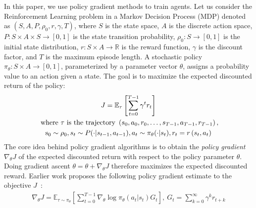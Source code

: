 \documentclass[letterpaper]{article}
\begin{document}
In this paper, we use  policy gradient methods to train agents.
Let us consider the Reinforcement Learning problem in a Markov Decision Process (MDP) denoted as $(S,A,P, \rho_0, r,\gamma, T)$, where $S$ is the state space, $A$ is the discrete action space, $P: S \times A \times S \rightarrow [0, 1]$ is the state transition probability, $\rho_0: S\rightarrow [0,1]$ is the initial state distribution, $r: S \times A \rightarrow \mathbb{R}$ is the reward function, $\gamma$ is the discount factor, and $T$ is the maximum episode length. A stochastic policy $\pi_{\theta}: S \times A \rightarrow [0,1]$, parameterized by a parameter vector $\theta$, assigns a probability value to an action given a state. The goal is to maximize the expected discounted return of the policy:
\begin{gather*}
        J = \mathbb{E}_{\tau}\left[\sum_{t=0}^{T-1} \gamma^{t} r_{t}\right]\\
        \text { where } \tau \text { is the trajectory } \left(s_{0}, a_{0}, r_{0},  \dots, s_{T-1}, a_{T-1}, r_{T-1}\right),\\
        \text  s_{0} \sim \rho_{0}, s_t \sim P(\cdot \vert s_{t-1}, a_{t-1}), a_t \sim \pi_{\theta}(\cdot \vert s_t), r_{t}=r\left(s_{t}, a_{t}\right)
\end{gather*}
The core idea behind policy gradient algorithms is to obtain the \textsl{policy gradient} $\nabla_{\theta}J$  of the expected discounted return with respect to the policy parameter $\theta$. Doing gradient ascent $\theta = \theta + \nabla_{\theta}J$ therefore maximizes the expected discounted reward.
Earlier work proposes the following policy gradient estimate to the objective $J$~\cite{sutton2018reinforcement}:
\begin{align*}
   \nabla_{\theta}J = \mathbb{E}_{\tau\sim\pi_\theta}\left[ \sum_{t=0}^{T-1} \nabla_{\theta}\log\pi_{\theta}(a_t|s_t)G_t \right]\mathrm{,} \  G_{t} = \sum_{k=0}^{\infty} \gamma^{k} r_{t+k}
\end{align*}


\end{document}
